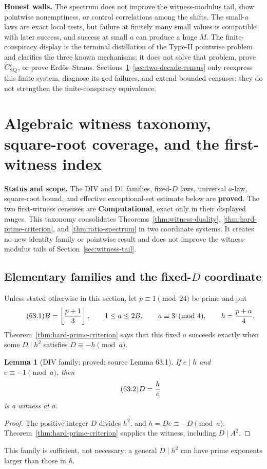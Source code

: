 \documentclass[10pt,reqno]{amsart}
\newtheorem{lemma}[theorem]{Lemma}
\theoremstyle{definition}
\newcommand{\1}{\mathbf 1}
\begin{document}
\medskip\noindent\textbf{Honest walls.}
The spectrum does not improve the witness-modulus tail, show pointwise
nonemptiness, or control correlations among the shifts.  The small-$a$ laws
are exact local tests, but failure at finitely many small values is
compatible with later success, and success at small $a$ can produce a huge
$M$.  The finite-conspiracy display is the terminal distillation of the
Type-II pointwise problem and clarifies the three known mechanisms; it does
not solve that problem, prove $C_{\rm SQ}'$, or prove Erd\H{o}s--Straus.
Sections~\ref{sec:witness-taxonomy}--\ref{sec:two-decade-census} only
reexpress this finite system, diagnose its gcd failures, and extend bounded
censuses; they do not strengthen the finite-conspiracy equivalence.

\section{Algebraic witness taxonomy, square-root coverage, and the first-witness index}
\label{sec:witness-taxonomy}
\medskip\noindent\textbf{Status and scope.}
The DIV and D1 families, fixed-$D$ laws, universal $a$-law, square-root
bound, and effective exceptional-set estimate below are \textbf{proved}.
The two first-witness censuses are \textbf{Computational}, exact only in
their displayed ranges.  This taxonomy consolidates
Theorems~\ref{thm:witness-duality}, \ref{thm:hard-prime-criterion}, and
\ref{thm:ratio-spectrum} in two coordinate systems.  It creates no new
identity family or pointwise result and does not improve the
witness-modulus tails of Section~\ref{sec:witness-tail}.

\subsection{Elementary families and the fixed-$D$ coordinate}
Unless stated otherwise in this section, let $p\equiv1\pmod {24}$ be prime
and put
\begin{equation}\tag{63.1}
 B=\left\lfloor{p+1\over3}\right\rfloor,
 \qquad1\leq a\leq2B,
 \qquad a\equiv3\pmod4,
 \qquad h={p+a\over4}.
\end{equation}
Theorem~\ref{thm:hard-prime-criterion} says that this fixed $a$ succeeds
exactly when some $D\mid h^2$ satisfies $D\equiv-h\pmod a$.

\begin{lemma}[DIV family; proved; source Lemma 63.1]\label{lem:DIV-family}
If $e\mid h$ and $e\equiv-1\pmod a$, then
\begin{equation}\tag{63.2}
                         D={h\over e}
\end{equation}
is a witness at $a$.
\end{lemma}
\begin{proof}
The positive integer $D$ divides $h^2$, and $h=De\equiv-D\pmod a$.
Theorem~\ref{thm:hard-prime-criterion} supplies the witness, including
$D\mid A^2$.
\end{proof}
This family is sufficient, not necessary: a general $D\mid h^2$ can have
prime exponents larger than those in $h$.
\end{document}

